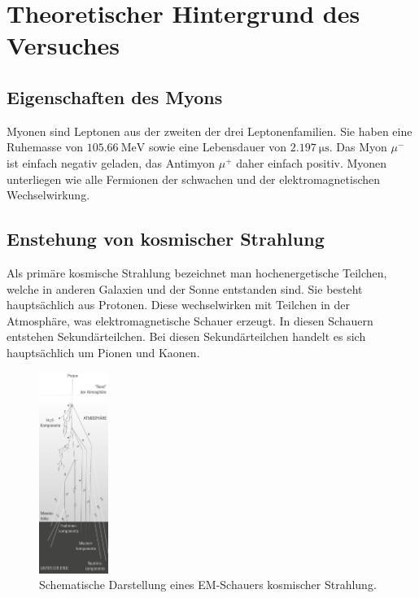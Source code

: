 \section{Theoretischer Hintergrund des Versuches}
\label{sec:Theorie}

\subsection{Eigenschaften des Myons}
\label{subsec:Eigenschaften}

Myonen sind Leptonen aus der zweiten der drei Leptonenfamilien. Sie haben
eine Ruhemasse von $\SI{105.66}{\mega\electronvolt}$ sowie eine Lebensdauer
von $\SI{2.197}{\micro\second}$. Das Myon $\mu^{-}$ ist einfach negativ geladen,
das Antimyon $\mu^{+}$ daher einfach positiv.
Myonen unterliegen wie alle Fermionen der schwachen und der elektromagnetischen
Wechselwirkung.

\subsection{Enstehung von kosmischer Strahlung}
\label{subsec:kosmischeStrahlung}

Als primäre kosmische Strahlung bezeichnet man hochenergetische Teilchen, welche
in anderen Galaxien und der Sonne entstanden sind. Sie besteht hauptsächlich aus Protonen.
Diese wechselwirken mit Teilchen in der Atmosphäre, was elektromagnetische
Schauer erzeugt. In diesen Schauern entstehen Sekundärteilchen. Bei diesen
Sekundärteilchen handelt es sich hauptsächlich um Pionen und Kaonen.

\begin{figure}
  \centering
  \includegraphics[width=0.2\textwidth]{pictures/Schauer.png}
  \caption{Schematische Darstellung eines EM-Schauers kosmischer Strahlung. \cite{Q1}}
  \label{fig:schauer}
\end{figure}
\noindent

